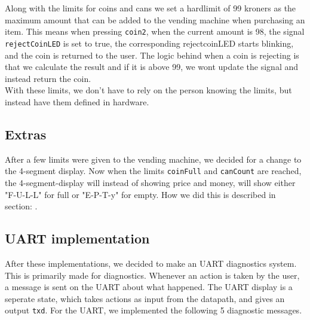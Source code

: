Along with the limits for coins and cans we set a hardlimit of 99 kroners as the maximum amount that can be added to the vending machine when purchasing an item. This means when pressing \texttt{coin2}, when the current amount is 98, the signal \texttt{rejectCoinLED} is set to true, the corresponding rejectcoinLED starts blinking, and the coin is returned to the user. The logic behind when a coin is rejecting is that we calculate the result and if it is above 99, we wont update the signal and instead return the coin.\\
With these limits, we don't have to rely on the person knowing the limits, but instead have them defined in hardware.

\subsection{Extras}
After a few limits were given to the vending machine, we decided for a change to the 4-segment display. Now when the limits \texttt{coinFull} and \texttt{canCount} are reached, the 4-segment-display will instead of showing price and money, will show either "F-U-L-L" for full or "E-P-T-y" for empty. How we did this is described in section: .

\subsection{UART implementation}
After these implementations, we decided to make an UART diagnostics system. This is primarily made for diagnostics. Whenever an action is taken by the user, a message is sent on the UART about what happened. The UART display is a seperate state, which takes actions as input from the datapath, and gives an output \texttt{txd}. For the UART, we implemented the following 5 diagnostic messages.

